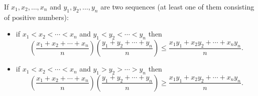 \documentclass[12pt]{article}
\begin{document}
If $x_1,x_2,\ldots,x_n$ and $y_1,y_2,\ldots,y_n$ are two sequences (at least one of them consisting of positive numbers):
\begin{itemize}
\item if $x_1<x_2<\cdots<x_n$ and $y_1<y_2<\cdots<y_n$ then$$\left(\frac{x_1+x_2+\cdots+x_n}{n}\right)\left(\frac{y_1+y_2+\cdots+y_n}{n}\right)
\le\frac{x_1y_1+x_2y_2+\cdots+x_ny_n}{n}.$$
\item if $x_1<x_2<\cdots<x_n$ and $y_1>y_2>\cdots>y_n$ then$$\left(\frac{x_1+x_2+\cdots+x_n}{n}\right)\left(\frac{y_1+y_2+\cdots+y_n}{n}\right)
\ge\frac{x_1y_1+x_2y_2+\cdots+x_ny_n}{n}.$$\end{itemize}
\end{document}
